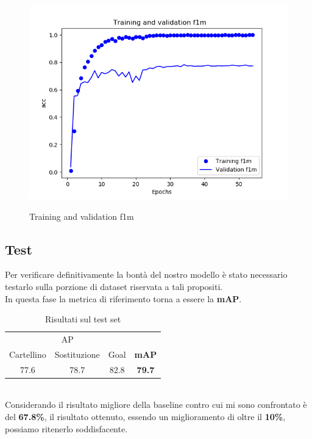 \begin{figure}[ht]
\centering
\caption{Training and validation f1m}
\includegraphics[scale=0.7]{img/training-validation-f1m.png}
\label{figure : trainingvalf1}
\end{figure}
\subsection{Test}
Per verificare definitivamente la bontà del nostro modello è stato necessario testarlo sulla porzione di dataset riservata a tali propositi. 
\\In questa fase la metrica di riferimento torna a essere la \textbf{mAP}.
\begin{table}[ht]
\label{table: test}
\caption{Risultati sul test set}
\centering
\begin{tabular}{c|c|c||c}
\multicolumn{3}{c}{AP} & \multicolumn{1}{c}{}  \\
Cartellino & Sostituzione & Goal & \textbf{mAP} \\
\hline
77.6& 78.7 & 82.8 & \textbf{79.7} \\ [1ex]
\end{tabular}
\end{table}
\\Considerando il risultato migliore della baseline contro cui mi sono confrontato è del \textbf{67.8\%}, il 
risultato ottenuto, essendo un miglioramento di oltre il \textbf{10\%}, possiamo ritenerlo soddisfacente.